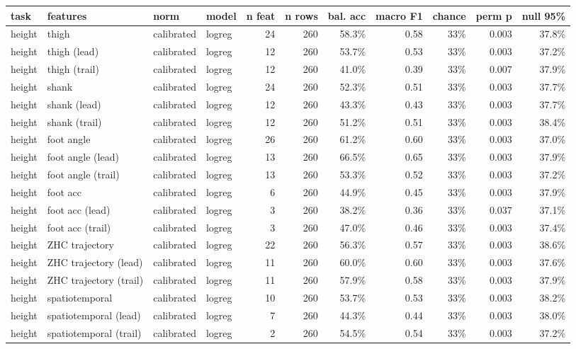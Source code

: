 \begin{adjustbox}{max width=\textwidth}
{\scriptsize
\begin{tabular}{llllrrrrrrr}
\toprule
\textbf{task} & \textbf{features} & \textbf{norm} & \textbf{model} & \textbf{n feat} & \textbf{n rows} & \textbf{bal. acc} & \textbf{macro F1} & \textbf{chance} & \textbf{perm p} & \textbf{null 95\%} \\
\midrule
height & thigh & calibrated & logreg & 24 & 260 & 58.3\% & 0.58 & 33\% & 0.003 & 37.8\% \\
height & thigh (lead) & calibrated & logreg & 12 & 260 & 53.7\% & 0.53 & 33\% & 0.003 & 37.2\% \\
height & thigh (trail) & calibrated & logreg & 12 & 260 & 41.0\% & 0.39 & 33\% & 0.007 & 37.9\% \\
height & shank & calibrated & logreg & 24 & 260 & 52.3\% & 0.51 & 33\% & 0.003 & 37.7\% \\
height & shank (lead) & calibrated & logreg & 12 & 260 & 43.3\% & 0.43 & 33\% & 0.003 & 37.7\% \\
height & shank (trail) & calibrated & logreg & 12 & 260 & 51.2\% & 0.51 & 33\% & 0.003 & 38.4\% \\
height & foot angle & calibrated & logreg & 26 & 260 & 61.2\% & 0.60 & 33\% & 0.003 & 37.0\% \\
height & foot angle (lead) & calibrated & logreg & 13 & 260 & 66.5\% & 0.65 & 33\% & 0.003 & 37.9\% \\
height & foot angle (trail) & calibrated & logreg & 13 & 260 & 53.3\% & 0.52 & 33\% & 0.003 & 37.2\% \\
height & foot acc & calibrated & logreg & 6 & 260 & 44.9\% & 0.45 & 33\% & 0.003 & 37.9\% \\
height & foot acc (lead) & calibrated & logreg & 3 & 260 & 38.2\% & 0.36 & 33\% & 0.037 & 37.1\% \\
height & foot acc (trail) & calibrated & logreg & 3 & 260 & 47.0\% & 0.46 & 33\% & 0.003 & 37.4\% \\
height & ZHC trajectory & calibrated & logreg & 22 & 260 & 56.3\% & 0.57 & 33\% & 0.003 & 38.6\% \\
height & ZHC trajectory (lead) & calibrated & logreg & 11 & 260 & 60.0\% & 0.60 & 33\% & 0.003 & 37.6\% \\
height & ZHC trajectory (trail) & calibrated & logreg & 11 & 260 & 57.9\% & 0.58 & 33\% & 0.003 & 37.9\% \\
height & spatiotemporal & calibrated & logreg & 10 & 260 & 53.7\% & 0.53 & 33\% & 0.003 & 38.2\% \\
height & spatiotemporal (lead) & calibrated & logreg & 7 & 260 & 44.3\% & 0.44 & 33\% & 0.003 & 38.0\% \\
height & spatiotemporal (trail) & calibrated & logreg & 2 & 260 & 54.5\% & 0.54 & 33\% & 0.003 & 37.2\% \\
\bottomrule
\end{tabular}
}
\end{adjustbox}
